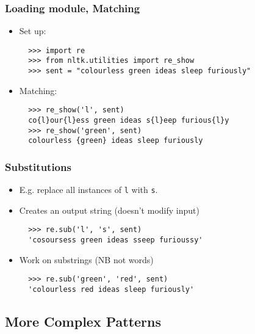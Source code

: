 \documentclass{beamer}             %
\begin{document}
\begin{frame}[fragile]
\frametitle{Loading module, Matching}

\begin{itemize}
\item Set up:

\begin{verbatim}
  >>> import re
  >>> from nltk.utilities import re_show
  >>> sent = "colourless green ideas sleep furiously"
\end{verbatim}

\item Matching:

\begin{verbatim}
  >>> re_show('l', sent)
  co{l}our{l}ess green ideas s{l}eep furious{l}y
  >>> re_show('green', sent)
  colourless {green} ideas sleep furiously
\end{verbatim}
\end{itemize}
\end{frame}

\begin{frame}[fragile]
\frametitle{Substitutions}

\begin{itemize}
\item E.g. replace all instances of \texttt{l} with \texttt{s}.
\item Creates an output string (doesn't modify input)

\begin{verbatim}
  >>> re.sub('l', 's', sent)
  'cosoursess green ideas sseep furioussy'
\end{verbatim}

\item Work on substrings (NB not words)

\begin{verbatim}
  >>> re.sub('green', 'red', sent)
  'colourless red ideas sleep furiously'
\end{verbatim}
\end{itemize}
\end{frame}

\subsection{More Complex Patterns}
\end{document}
